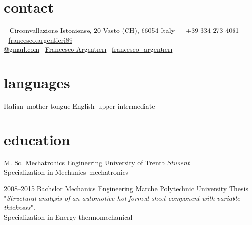 \documentclass[]{friggeri-cv} %
\newcommand{\LinkedinColour}{{\color{linkedin} \faLinkedin}}
\newcommand{\Email}{{\color{black} \faEnvelope \,}}
\newcommand{\Skype}{{\color{skypeblue} \faSkype}}
\newcommand{\Phone}{{\color{phonegreen} \faPhone}}
\begin{document}


\begin{aside} %
\section{contact}
~
Circonvallazione Istoniense, 20
Vasto (CH), 66054
Italy
~
\Phone \, +39 334 273 4061
~
\Email \, \href{mailto:francesco.argentieri89@gmail.com}{francesco.argentieri89\\@gmail.com}
\LinkedinColour \, \href{https://it.linkedin.com/in/francesco-argentieri}{Francesco Argentieri}
\Skype \, \href{skype:my_username?add}{francesco\_argentieri}
\section{languages}
Italian--mother tongue
English--upper intermediate
\end{aside}


\section{education}

\begin{entrylist}


{M. Sc. {\normalfont Mechatronics Engineering}}
{University of Trento}
{\emph{Student}\\ Specialization in Mechanics--mechatronics}


\entry
{2008--2015}
{Bachelor {\normalfont Mechanics Engineering}}
{Marche Polytechnic University}
{Thesis "\emph{Structural analysis of an automotive hot formed sheet component with variable thickness}".\\
Specialization in Energy-thermomechanical}


\end{entrylist}
\end{document}

